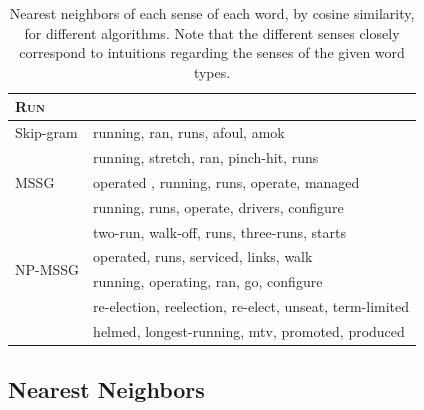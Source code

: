 \documentclass[11pt,a4paper]{article}
\begin{document}
\begin{table}[t!]
{\begin{tabular}{|l|l|}
\multicolumn{2}{l}{\textsc{Run}}\\ \hline
 Skip-gram  & running, ran, runs, afoul, amok  \\  \hline
 \multirow{3}{*}{MSSG}& running, stretch, ran, pinch-hit, runs  \\
 & operated , running, runs, operate, managed \\
 & running, runs, operate, drivers, configure \\ \hline
 \multirow{4}{*}{NP-MSSG} &  two-run, walk-off, runs, three-runs, starts \\
 & operated, runs, serviced, links, walk \\
 & running, operating, ran, go, configure \\
 & re-election, reelection, re-elect, unseat, term-limited \\
 & helmed, longest-running, mtv, promoted, produced \\
 \hline
 
 \end{tabular}
 }
 \caption{Nearest neighbors of each sense of each word, by cosine similarity, for different algorithms. Note that the different senses closely correspond to intuitions regarding the senses of the given word types.}
\label{table:knn}
\end{table}


\subsection{Nearest Neighbors}
\label{sec:qual-analys-near}
\end{document}
